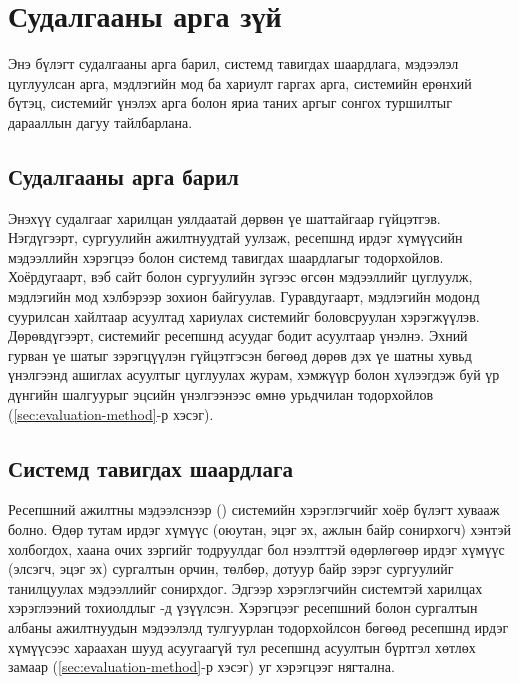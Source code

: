 \chapter{Судалгааны арга зүй}
\label{ch:method}


Энэ бүлэгт судалгааны арга барил, системд тавигдах шаардлага, мэдээлэл цуглуулсан арга, мэдлэгийн мод ба хариулт гаргах арга, системийн ерөнхий бүтэц, системийг үнэлэх арга болон яриа таних аргыг сонгох туршилтыг дарааллын дагуу тайлбарлана.

\section{Судалгааны арга барил}
\label{sec:approach}

Энэхүү судалгааг харилцан уялдаатай дөрвөн үе шаттайгаар гүйцэтгэв. Нэгдүгээрт, сургуулийн ажилтнуудтай уулзаж, ресепшнд ирдэг хүмүүсийн мэдээллийн хэрэгцээ болон системд тавигдах шаардлагыг тодорхойлов. Хоёрдугаарт, вэб сайт болон сургуулийн зүгээс өгсөн мэдээллийг цуглуулж, мэдлэгийн мод хэлбэрээр зохион байгуулав. Гуравдугаарт, мэдлэгийн модонд суурилсан хайлтаар асуултад хариулах системийг боловсруулан хэрэгжүүлэв. Дөрөвдүгээрт, системийг ресепшнд асуудаг бодит асуултаар үнэлнэ. Эхний гурван үе шатыг зэрэгцүүлэн гүйцэтгэсэн бөгөөд дөрөв дэх үе шатны хувьд үнэлгээнд ашиглах асуултыг цуглуулах журам, хэмжүүр болон хүлээгдэж буй үр дүнгийн шалгуурыг эцсийн үнэлгээнээс өмнө урьдчилан тодорхойлов (\ref{sec:evaluation-method}-р хэсэг).

\section{Системд тавигдах шаардлага}
\label{sec:requirements}

Ресепшний ажилтны мэдээлснээр () системийн хэрэглэгчийг хоёр бүлэгт хувааж болно. Өдөр тутам ирдэг хүмүүс (оюутан, эцэг эх, ажлын байр сонирхогч) хэнтэй холбогдох, хаана очих зэргийг тодруулдаг бол нээлттэй өдөрлөгөөр ирдэг хүмүүс (элсэгч, эцэг эх) сургалтын орчин, төлбөр, дотуур байр зэрэг сургуулийг танилцуулах мэдээллийг сонирхдог. Эдгээр хэрэглэгчийн системтэй харилцах хэрэглээний тохиолдлыг -д үзүүлсэн. Хэрэгцээг ресепшний болон сургалтын албаны ажилтнуудын мэдээлэлд тулгуурлан тодорхойлсон бөгөөд ресепшнд ирдэг хүмүүсээс хараахан шууд асуугаагүй тул ресепшнд асуултын бүртгэл хөтлөх замаар (\ref{sec:evaluation-method}-р хэсэг) уг хэрэгцээг нягтална.

